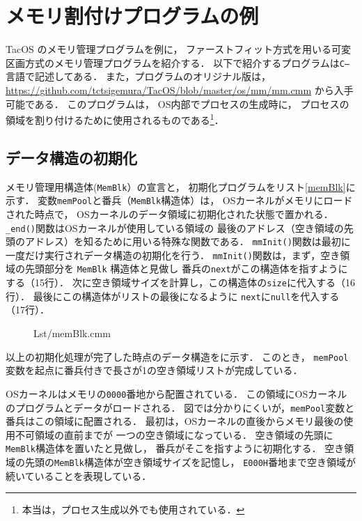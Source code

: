 \chapter{メモリ割付けプログラムの例}
TacOS のメモリ管理プログラムを例に，
ファーストフィット方式を用いる可変区画方式のメモリ管理プログラムを紹介する．
以下で紹介するプログラムは{\tt C--}言語で記述してある．
また，プログラムのオリジナル版は，
\url{https://github.com/tctsigemura/TacOS/blob/master/os/mm/mm.cmm}
から入手可能である．
このプログラムは，
OS内部でプロセスの生成時に，
プロセスの領域を割り付けるために使用されるものである\footnote{
本当は，プロセス生成以外でも使用されている．}．

\section{データ構造の初期化}
メモリ管理用構造体({\tt MemBlk}）の宣言と，
初期化プログラムをリスト\ref{memBlk}に示す．
変数{\tt memPool}と番兵（{\tt MemBlk}構造体）は，
OSカーネルがメモリにロードされた時点で，
OSカーネルのデータ領域に初期化された状態で置かれる．
{\tt \_end()}関数はOSカーネルが使用している領域の
最後のアドレス（空き領域の先頭のアドレス）を知るために用いる特殊な関数である．
{\tt mmInit()}関数は最初に一度だけ実行されデータ構造の初期化を行う．
{\tt mmInit()}関数は，まず，空き領域の先頭部分を {\tt MemBlk} 構造体と見做し
番兵の{\tt next}がこの構造体を指すようにする（15行）．
次に空き領域サイズを計算し，この構造体の{\tt size}に代入する（16行）．
最後にこの構造体がリストの最後になるように
{\tt next}に{\tt null}を代入する（17行）．

\begin{figure}[btph]

{Lst/memBlk.cmm}
\end{figure}

以上の初期化処理が完了した時点のデータ構造をに示す．
このとき，
{\tt memPool}変数を起点に番兵付きで長さが1の空き領域リストが完成している．

OSカーネルはメモリの{\tt 0000}番地から配置されている．
この領域にOSカーネルのプログラムとデータがロードされる．
図では分かりにくいが，{\tt memPool}変数と番兵はこの領域に配置される．
最初は，OSカーネルの直後からメモリ最後の使用不可領域の直前までが
一つの空き領域になっている．
空き領域の先頭に{\tt MemBlk}構造体を置いたと見做し，
番兵がそこを指すように初期化する．
空き領域の先頭の{\tt MemBlk}構造体が空き領域サイズを記憶し，
{\tt E000H}番地まで空き領域が続いていることを表現している．

